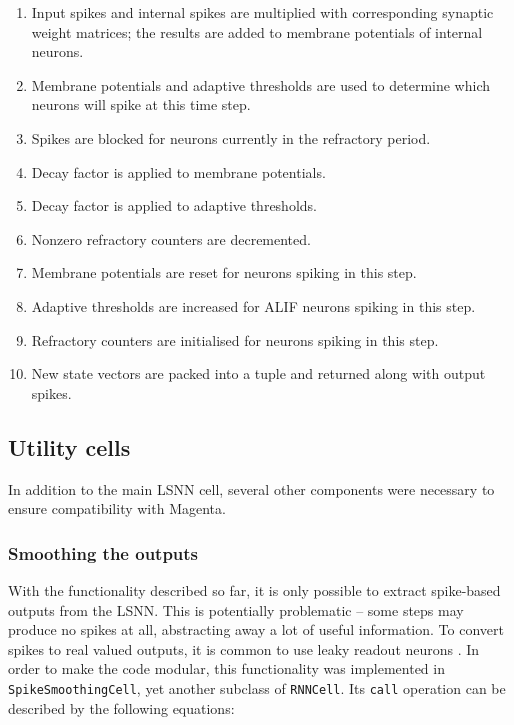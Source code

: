 \documentclass[../../report.tex]{subfiles}
\begin{document}
\begin{enumerate}

  \item Input spikes and internal spikes are multiplied with corresponding
  synaptic weight matrices; the results are added to membrane potentials of
  internal neurons.

  \item Membrane potentials and adaptive thresholds are used to determine which
  neurons will spike at this time step.

  \item Spikes are blocked for neurons currently in the refractory period.

  \item Decay factor is applied to membrane potentials.

  \item Decay factor is applied to adaptive thresholds.

  \item Nonzero refractory counters are decremented.

  \item Membrane potentials are reset for neurons spiking in this step.

  \item Adaptive thresholds are increased for ALIF neurons spiking in this step.

  \item Refractory counters are initialised for neurons spiking in this step.

  \item New state vectors are packed into a tuple and returned along with output
  spikes.

\end{enumerate}

\subsection{Utility cells}

In addition to the main LSNN cell, several other components were necessary to
ensure compatibility with Magenta.

\subsubsection{Smoothing the outputs}
With the functionality described so far, it is only possible to extract
spike-based outputs from the LSNN. This is potentially problematic -- some steps
may produce no spikes at all, abstracting away a lot of useful information. To
convert spikes to real valued outputs, it is common to use leaky readout neurons
\cite{Bellec2018LSNN, Bellec2020}. In order to make the code modular, this
functionality was implemented in \texttt{SpikeSmoothingCell}, yet another
subclass of \texttt{RNNCell}. Its \texttt{call} operation can be described by
the following equations:
\end{document}
